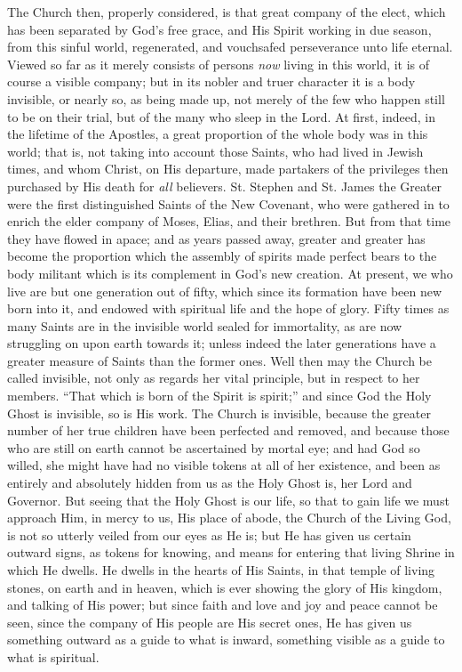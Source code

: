 The Church then, properly considered, is that great company of the
elect, which has been separated by God's free grace, and His Spirit
working in due season, from this sinful world, regenerated, and
vouchsafed perseverance unto life eternal. Viewed so far as it merely
consists of persons \emph{now} living in this world, it is of course a
visible company; but in its nobler and truer character it is a body
invisible, or nearly so, as being made up, not merely of the few who
happen still to be on their trial, but of the many who sleep in the
Lord. At first, indeed, in the lifetime of the Apostles, a great
proportion of the whole body was in this world; that is, not taking
into account those Saints, who had lived in Jewish times, and whom
Christ, on His departure, made partakers of the privileges then
purchased by His death for \emph{all} believers. St. Stephen and St.
James the Greater were the first distinguished Saints of the New
Covenant, who were gathered in to enrich the elder company of Moses,
Elias, and their brethren. But from that time they have flowed in
apace; and as years passed away, greater and greater has become the
proportion which the assembly of spirits made perfect bears to the
body militant which is its complement in God's new creation. At
present, we who live are but one generation out of fifty, which since
its formation have been new born into it, and endowed with spiritual
life and the hope of glory. Fifty times as many Saints are in the
invisible world sealed for immortality, as are now struggling on upon
earth towards it; unless indeed the later generations have a greater
measure of Saints than the former ones. Well then may the Church be
called invisible, not only as regards her vital principle, but in
respect to her members. ``That which is born of the Spirit is
spirit;'' and since God the Holy Ghost is invisible, so is His
work. The Church is invisible, because the greater number of her true
children have been perfected and removed, and because those who are
still on earth cannot be ascertained by mortal eye; and had God so
willed, she might have had no visible tokens at all of her existence,
and been as entirely and absolutely hidden from us as the Holy Ghost
is, her Lord and Governor. But seeing that the Holy Ghost is our life,
so that to gain life we must approach Him, in mercy to us, His place
of abode, the Church of the Living God, is not so utterly veiled from
our eyes as He is; but He has given us certain outward signs, as
tokens for knowing, and means for entering that living Shrine in which
He dwells. He dwells in the hearts of His Saints, in that temple of
living stones, on earth and in heaven, which is ever showing the glory
of His kingdom, and talking of His power; but since faith and love and
joy and peace cannot be seen, since the company of His people are His
secret ones, He has given us something outward as a guide to what is
inward, something visible as a guide to what is spiritual.

